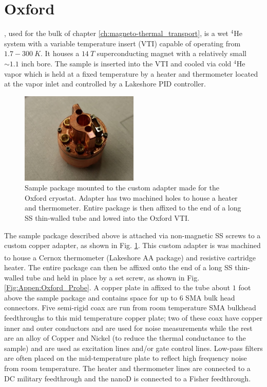 \section{Oxford}
\label{Appen:Oxford}
, used for the bulk of chapter \ref{ch:magneto-thermal_transport}, is a wet $^4$He system with a variable temperature insert (VTI) capable of operating from $1.7-300~K$. It houses a $14~T$ superconducting magnet with a relatively small ${\sim}1.1$  inch bore. The sample is inserted into the VTI and cooled via cold $^4$He vapor which is held at a fixed temperature by a heater and thermometer located at the vapor inlet and controlled by a Lakeshore PID controller. 

\begin{figure}
\centering
\includegraphics[width = 0.5\textwidth]{figures/appendix/cryostats/Oxford_package.jpg}
\caption{Sample package mounted to the custom adapter made for the Oxford cryostat. Adapter has two machined holes to house a heater and thermometer. Entire package is then affixed to the end of a long SS thin-walled tube and lowed into the Oxford VTI.}
\label{Fig:Appen:Oxford_package}
\end{figure}

The sample package described above is attached via non-magnetic SS screws to a custom copper adapter, as shown in Fig. \ref{Fig:Appen:Oxford_package}. This custom adapter is was machined to house a Cernox\textsuperscript{\textregistered} thermometer (Lakeshore AA package) and resistive cartridge heater. The entire package can then be affixed onto the end of a long SS thin-walled tube and held in place by a set screw, as shown in Fig. \ref{Fig:Appen:Oxford_Probe}. A copper plate in affixed to the tube about $1$ foot above the sample package and contains space for up to 6 SMA bulk head connectors. Five semi-rigid coax are run from room temperature SMA bulkhead feedthroughs to this mid temperature copper plate; two of these coax have copper inner and outer conductors and are used for noise measurements while the rest are an alloy of Copper and Nickel (to reduce the thermal conductance to the sample) and are used as excitation lines and/or gate control lines. Low-pass filters are often placed on the mid-temperature plate to reflect high frequency noise from room temperature. The heater and thermometer lines are connected to a DC military feedthrough and the nanoD is connected to a Fisher feedthrough.

